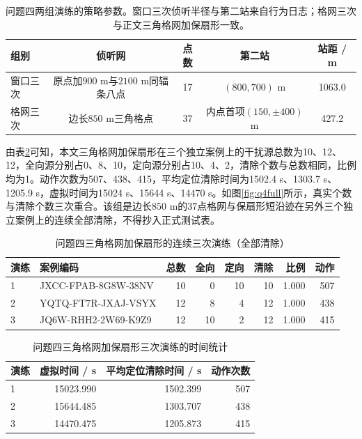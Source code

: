 \documentclass{cumcmthesis}
\begin{document}
\begin{table}[htbp]
\centering
\caption{问题四两组演练的策略参数。窗口三次侦听半径与第二站来自行为日志；格网三次与正文三角格网加保扇形一致。}
\label{tab:q4policy}
\scriptsize
\begin{tabular}{lcccc}
\toprule
组别 & 侦听网 & 点数 & 第二站 & 站距 / m \\
\midrule
窗口三次 & 原点加$900$ m与$2100$ m同辐条八点 & 17 & $(800,700)$ m & 1063.0 \\
格网三次 & 边长$850$ m三角格点 & 37 & 内点首项$(150,\pm 400)$ m & 427.2 \\
\bottomrule
\end{tabular}
\end{table}

由表\ref{tab:q4full}可知，本文三角格网加保扇形在三个独立案例上的干扰源总数为10、12、12，全向源分别占0、8、10，定向源分别占10、4、2，清除个数与总数相同，比例均为1。动作次数为507、438、415，平均定位清除时间为1502.4 s、1303.7 s、1205.9 s，虚拟时间为15024 s、15644 s、14470 s。如图\ref{fig:q4full}所示，真实个数与清除个数三次重合。该组是边长$850$ m的$37$点格网与保扇形短沿迹在另外三个独立案例上的连续全部清除，不得抄入正式测试表。

\begin{table}[htbp]
\centering
\caption{问题四三角格网加保扇形的连续三次演练（全部清除）}
\label{tab:q4full}
\scriptsize
\begin{tabular}{llrrrrrr}
\toprule
演练 & 案例编码 & 总数 & 全向 & 定向 & 清除 & 比例 & 动作 \\
\midrule
1 & JXCC-FPAB-8G8W-38NV & 10 & 0 & 10 & 10 & 1.000 & 507 \\
2 & YQTQ-FT7R-JXAJ-VSYX & 12 & 8 & 4 & 12 & 1.000 & 438 \\
3 & JQ6W-RHH2-2W69-K9Z9 & 12 & 10 & 2 & 12 & 1.000 & 415 \\
\bottomrule
\end{tabular}
\end{table}

\begin{table}[htbp]
\centering
\caption{问题四三角格网加保扇形三次演练的时间统计}
\label{tab:q4fullt}
\begin{tabular}{lrrr}
\toprule
演练 & 虚拟时间 / s & 平均定位清除时间 / s & 动作次数 \\
\midrule
1 & 15023.990 & 1502.399 & 507 \\
2 & 15644.485 & 1303.707 & 438 \\
3 & 14470.475 & 1205.873 & 415 \\
\bottomrule
\end{tabular}
\end{table}
\end{document}
